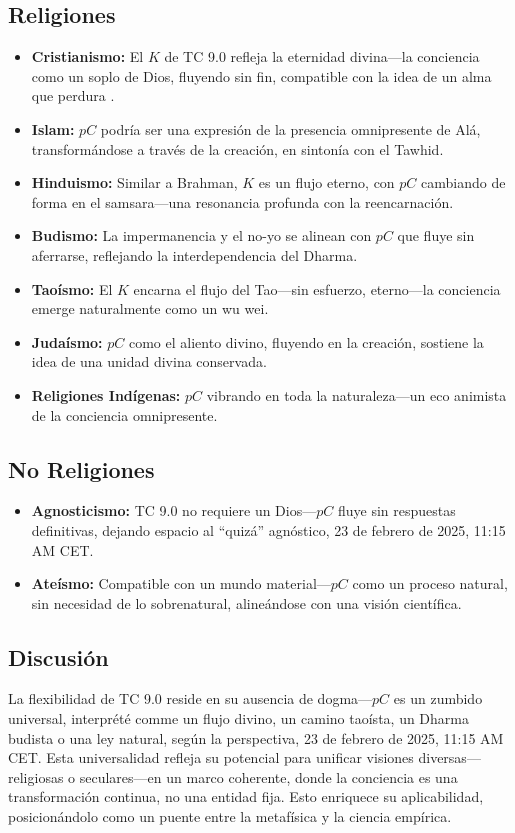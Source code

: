 \documentclass[11pt]{article}
\begin{document}
\subsection{Religiones}
\begin{itemize}
    \item \textbf{Cristianismo:} El $K$ de TC 9.0 refleja la eternidad divina—la conciencia como un soplo de Dios, fluyendo sin fin, compatible con la idea de un alma que perdura \citep{tononi2008consciousness}.
    \item \textbf{Islam:} $pC$ podría ser una expresión de la presencia omnipresente de Alá, transformándose a través de la creación, en sintonía con el Tawhid.
    \item \textbf{Hinduismo:} Similar a Brahman, $K$ es un flujo eterno, con $pC$ cambiando de forma en el samsara—una resonancia profunda con la reencarnación.
    \item \textbf{Budismo:} La impermanencia y el no-yo se alinean con $pC$ que fluye sin aferrarse, reflejando la interdependencia del Dharma.
    \item \textbf{Taoísmo:} El $K$ encarna el flujo del Tao—sin esfuerzo, eterno—la conciencia emerge naturalmente como un wu wei.
    \item \textbf{Judaísmo:} $pC$ como el aliento divino, fluyendo en la creación, sostiene la idea de una unidad divina conservada.
    \item \textbf{Religiones Indígenas:} $pC$ vibrando en toda la naturaleza—un eco animista de la conciencia omnipresente.
\end{itemize}

\subsection{No Religiones}
\begin{itemize}
    \item \textbf{Agnosticismo:} TC 9.0 no requiere un Dios—$pC$ fluye sin respuestas definitivas, dejando espacio al “quizá” agnóstico, 23 de febrero de 2025, 11:15 AM CET.
    \item \textbf{Ateísmo:} Compatible con un mundo material—$pC$ como un proceso natural, sin necesidad de lo sobrenatural, alineándose con una visión científica.
\end{itemize}

\subsection{Discusión}
La flexibilidad de TC 9.0 reside en su ausencia de dogma—$pC$ es un zumbido universal, interprété comme un flujo divino, un camino taoísta, un Dharma budista o una ley natural, según la perspectiva, 23 de febrero de 2025, 11:15 AM CET. Esta universalidad refleja su potencial para unificar visiones diversas—religiosas o seculares—en un marco coherente, donde la conciencia es una transformación continua, no una entidad fija. Esto enriquece su aplicabilidad, posicionándolo como un puente entre la metafísica y la ciencia empírica.
\end{document}

